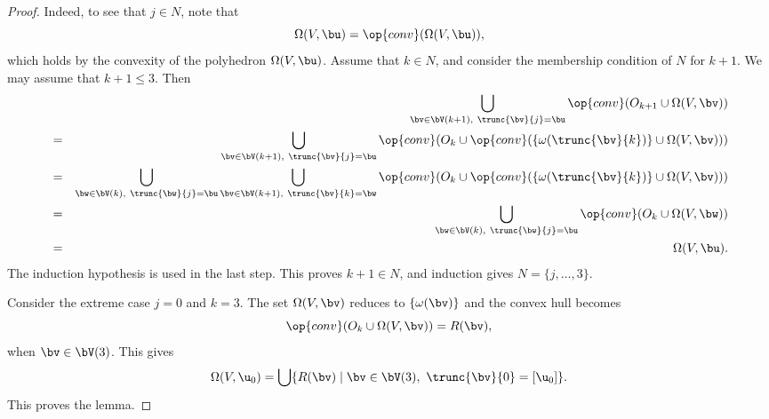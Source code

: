 \begin{proof}
  Indeed, to see that $j\in N$, note that
\begin{displaymath} 
\Omega(V,\bu) = \op{conv}(\Omega(V,\bu)),
\end{displaymath}
which holds by the convexity of the polyhedron $\Omega(V,\bu)$.
Assume that $k\in N$, and consider the membership condition of $N$  for
$k+1$.  We may assume that $k+1\le 3$.
Then
\begin{eqnarray*} 
&\phantom{=}&\bigcup _{\bv \in \bV(k+1),~\trunc{\bv}{j}=\bu}
\op{conv}(O_{k+1} \cup\Omega(V,\bv))
%
\vspace{6pt}\\
&=&\bigcup _{\bv \in \bV(k+1),~\trunc{\bv}{j}=\bu}
\op{conv}(O_{k} \cup\op{conv}(\{\omega(\trunc{\bv}{k})\}\cup\Omega(V,\bv)))
\vspace{6pt}\\
&=&\bigcup _{\bw\in \bV(k),~\trunc{\bw}{j}=\bu}
\bigcup_{\bv \in \bV(k+1),~\trunc{\bv}{k}=\bw}
\op{conv}(O_{k} \cup\op{conv}(\{\omega(\trunc{\bv}{k})\}\cup\Omega(V,\bv)))
\vspace{6pt}\\
&=&\bigcup _{\bw\in \bV(k),~\trunc{\bw}{j}=\bu}
\op{conv}(O_{k} \cup \Omega(V,\bw)    )
\vspace{6pt}\\
&=&\quad\Omega(V,\bu).
\end{eqnarray*}
The induction hypothesis is used in the last step.  
This proves $k+1\in N$, and induction gives $N=\{j,\ldots,3\}$.

Consider  the extreme case $j=0$ and $k=3$.  The set $\Omega(V,\bv)$
reduces to $\{\omega(\bv)\}$  and the convex hull becomes
\begin{displaymath} 
\op{conv}(O_{k}\cup \Omega(V,\bv)) = R(\bv),
\end{displaymath}
when $\bv\in \bV(3)$.
This gives
\begin{equation} 
\Omega(V,\u_0) = 
\bigcup \{ R(\bv) \mid \bv\in \bV(3),~\trunc{\bv}{0} =[\u_0]\}.
\end{equation}
This proves the lemma.
\end{proof}


